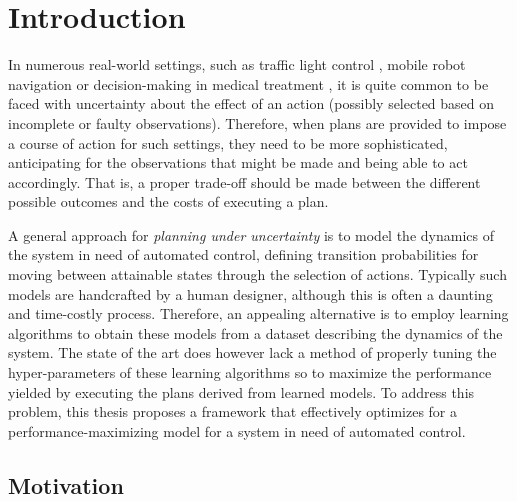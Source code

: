 \chapter{Introduction}
\label{ch:introduction}

In numerous real-world settings, such as traffic light control \cite{wiering2004intelligent}, mobile robot navigation \cite{MartinezCantin2009} or decision-making in medical treatment \cite{schaefer2005modeling}, it is quite common to be faced with uncertainty about the effect of an action (possibly selected based on incomplete or faulty observations).
Therefore, when plans are provided to impose a course of action for such settings, they need to be more sophisticated, anticipating for the observations that might be made and being able to act accordingly.
That is, a proper trade-off should be made between the different possible outcomes and the costs of executing a plan.

A general approach for \textit{planning under uncertainty} is to model the dynamics of the system in need of automated control, defining transition probabilities for moving between attainable states through the selection of actions.
Typically such models are handcrafted by a human designer, although this is often a daunting and time-costly process.
Therefore, an appealing alternative is to employ learning algorithms to obtain these models from a dataset describing the dynamics of the system.
The state of the art does however lack a method of properly tuning the hyper-parameters of these learning algorithms so to maximize the performance yielded by executing the plans derived from learned models.
To address this problem, this thesis proposes a framework that effectively optimizes for a performance-maximizing model for a system in need of automated control.

\section{Motivation}
\label{sec:motivation}

